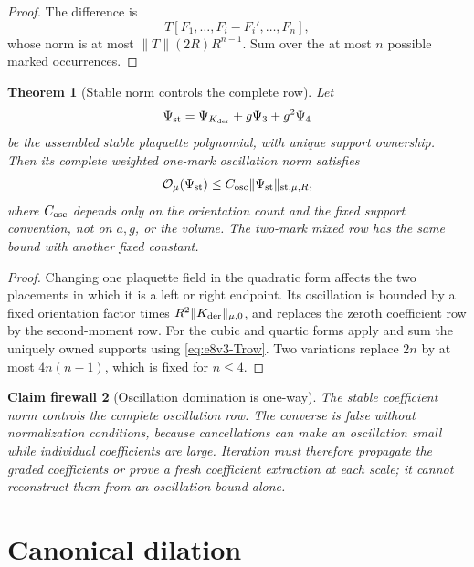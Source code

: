 \documentclass[11pt,oneside]{book}
\newtheorem{theorem}{Theorem}[chapter]
\newtheorem{firewall}[theorem]{Claim firewall}
\theoremstyle{definition}
\theoremstyle{remark}
\begin{document}
\begin{proof}
The difference is
\[
 T[F_1,\ldots,F_i-F_i',\ldots,F_n],
\]
whose norm is at most
\(\|T\|(2R)R^{n-1}\).  Sum over the at most \(n\) possible marked
occurrences.
\end{proof}

\begin{theorem}[Stable norm controls the complete row]
\label{thm:e8v3-domination}
Let
\[
 \Psi_{\rm st}
 =
 \Psi_{K_{\rm der}}+g\Psi_3+g^2\Psi_4               \label{eq:e8v3-Psi}
\]
be the assembled stable plaquette polynomial, with unique support
ownership.  Then its complete weighted one-mark oscillation norm
satisfies
\[
 {\cal O}_\mu(\Psi_{\rm st})
 \leq
 C_{\rm osc}\|\Psi_{\rm st}\|_{{\rm st},\mu,R},      \label{eq:e8v3-domination}
\]
where \(C_{\rm osc}\) depends only on the orientation count and the
fixed support convention, not on \(a,g\), or the volume.  The
two-mark mixed row has the same bound with another fixed constant.
\end{theorem}

\begin{proof}
Changing one plaquette field in the quadratic form affects the two
placements in which it is a left or right endpoint.  Its oscillation
is bounded by a fixed orientation factor times
\(R^2\|K_{\rm der}\|_{\mu,0}\), and
 replaces the zeroth coefficient row by the
second-moment row.  For the cubic and quartic forms apply
 and sum the uniquely owned supports using
\eqref{eq:e8v3-Trow}.  Two variations replace \(2n\) by at most
\(4n(n-1)\), which is fixed for \(n\leq4\).
\end{proof}

\begin{firewall}[Oscillation domination is one-way]
\label{fire:e8v3-one-way}
The stable coefficient norm controls the complete oscillation row.
The converse is false without normalization conditions, because
cancellations can make an oscillation small while individual
coefficients are large.  Iteration must therefore propagate the
graded coefficients or prove a fresh coefficient extraction at each
scale; it cannot reconstruct them from an oscillation bound alone.
\end{firewall}

\section{Canonical dilation}
\label{sec:e8v3-dilation}
\end{document}
